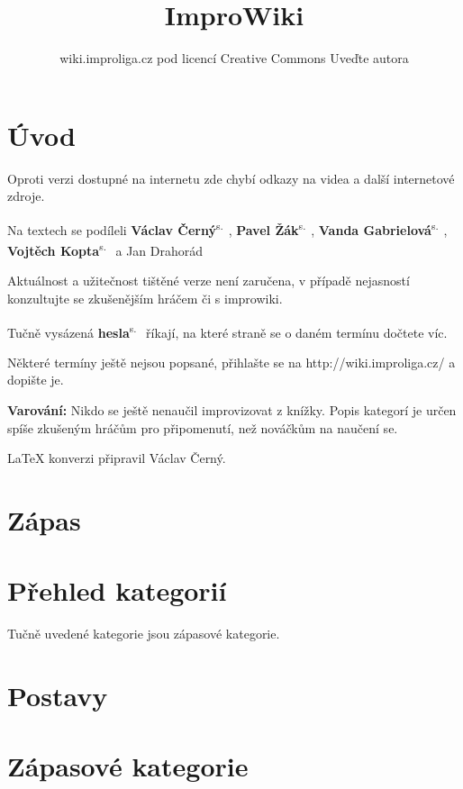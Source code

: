 \documentclass[a4paper,10pt,openany]{book}
\title{ImproWiki}
\author{wiki.improliga.cz pod licencí Creative Commons Uveďte autora}
\newcommand{\odkaz}[2]{\textbf{#1}\textsuperscript{s.~\pageref{#2}}}
\begin{document}
\begin{titlepage}
\maketitle
\end{titlepage}
 
\chapter{Úvod}\label{úvod}

 

Oproti verzi dostupné na internetu zde chybí odkazy na videa a další internetové zdroje.

Na textech se podíleli \odkaz{Václav Černý}{uživatel:vatoz}, \odkaz{Pavel Žák}{uživatel:just-paja}, \odkaz{Vanda Gabrielová}{uživatel:vandagabi}, \odkaz{Vojtěch Kopta}{uživatel:vojtechkopta} a Jan Drahorád

Aktuálnost a užitečnost tištěné verze není zaručena, v případě nejasností konzultujte se zkušenějším hráčem či s improwiki.

Tučně vysázená \odkaz{hesla}{úvod} říkají, na které straně se o daném termínu dočtete víc.

Některé termíny ještě nejsou popsané, přihlašte se na http://wiki.improliga.cz/ a dopište je.

\textbf{Varování:} Nikdo se ještě nenaučil improvizovat z knížky. Popis kategorí je určen spíše zkušeným hráčům pro připomenutí, než nováčkům na naučení se.  

\LaTeX{} konverzi připravil  Václav Černý. 
\chapter{Zápas}




\chapter{Přehled kategorií}
Tučně uvedené kategorie jsou zápasové kategorie.




\chapter{Postavy}



\chapter{Zápasové kategorie}
\label{zápasové kategorie}
\label{:kategorie:zápasové kategorie}


\end{document}

